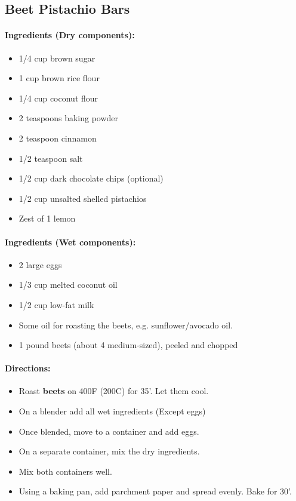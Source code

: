 \documentclass{article}
\begin{document}
\subsection{Beet Pistachio Bars}

\paragraph{Ingredients (Dry components):}
\begin{itemize}
	\item 1/4 cup brown sugar
	\item 1 cup brown rice flour
	\item 1/4 cup coconut flour
	\item 2 teaspoons baking powder
	\item 2 teaspoon cinnamon
	\item 1/2 teaspoon salt
	\item 1/2 cup dark chocolate chips (optional)
	\item 1/2 cup unsalted shelled pistachios
	\item Zest of 1 lemon
\end{itemize}

\paragraph{Ingredients (Wet components):}
\begin{itemize}
	\item 2 large eggs
	\item 1/3 cup melted coconut oil
	\item 1/2 cup low-fat milk
	\item Some oil for roasting the beets, e.g. sunflower/avocado oil.
	\item 1 pound beets (about 4 medium-sized), peeled and chopped
\end{itemize}

\paragraph{Directions:}
\begin{itemize}
	\item Roast \textbf{beets} on 400F (200C) for 35'. Let them cool.
	\item On a blender add all wet ingredients (Except eggs)
	\item Once blended, move to a container and add eggs.
	\item On a separate container, mix the dry ingredients.
	\item Mix both containers well.
	\item Using a baking pan, add parchment paper and spread evenly. Bake for 30'.
\end{itemize}
\end{document}
